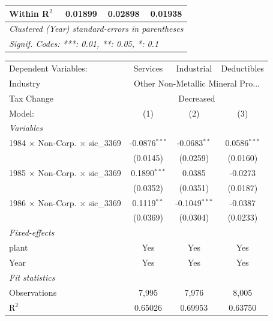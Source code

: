 \documentclass[
  12pt]{article}
\theoremstyle{definition}
\theoremstyle{remark}
\begin{document}
\begin{table}
\begin{minipage}{\linewidth}
\begin{tabular}{lccc}
   Within R$^2$                                  & 0.01899         & 0.02898        & 0.01938\\  
   \midrule \midrule
   \multicolumn{4}{l}{\emph{Clustered (Year) standard-errors in parentheses}}\\
   \multicolumn{4}{l}{\emph{Signif. Codes: ***: 0.01, **: 0.05, *: 0.1}}\\
\end{tabular}
\par\endgroup
\begingroup
\centering
\begin{tabular}{lccc}
   \tabularnewline \midrule \midrule
   Dependent Variables:                          & Services        & Industrial      & Deductibles\\  
   Industry & \multicolumn{3}{c}{Other Non-Metallic Mineral Pro...} \\ 
   Tax Change & \multicolumn{3}{c}{Decreased} \\ 
   Model:                                        & (1)             & (2)             & (3)\\  
   \midrule
   \emph{Variables}\\
   1984 $\times$ Non-Corp. $\times$ sic\_3369    & -0.0876$^{***}$ & -0.0683$^{**}$  & 0.0586$^{***}$\\   
                                                 & (0.0145)        & (0.0259)        & (0.0160)\\   
   1985 $\times$ Non-Corp. $\times$ sic\_3369    & 0.1890$^{***}$  & 0.0385          & -0.0273\\   
                                                 & (0.0352)        & (0.0351)        & (0.0187)\\   
   1986 $\times$ Non-Corp. $\times$ sic\_3369    & 0.1119$^{**}$   & -0.1049$^{***}$ & -0.0387\\   
                                                 & (0.0369)        & (0.0304)        & (0.0233)\\   
   \midrule
   \emph{Fixed-effects}\\
   plant                                         & Yes             & Yes             & Yes\\  
   Year                                          & Yes             & Yes             & Yes\\  
   \midrule
   \emph{Fit statistics}\\
   Observations                                  & 7,995           & 7,976           & 8,005\\  
   R$^2$                                         & 0.65026         & 0.69953         & 0.63750\\  

\end{tabular}
\end{minipage}
\end{table}
\end{document}
